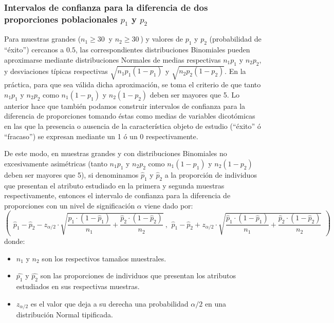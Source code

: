 \subsubsection {Intervalos de confianza para la diferencia de dos proporciones poblacionales $p_1$ y $p_2$}
Para muestras grandes ($n_1\geq30~$ y $n_2\geq30~$) y valores de $p_1$ y $p_2$ (probabilidad de ``éxito'') cercanos a
$0.5$, las correspondientes distribuciones Binomiales pueden aproximarse mediante distribuciones Normales de medias
respectivas $n_1p_1$ y $n_2p_2$, y desviaciones típicas respectivas $\sqrt {n_1p_1(1-p_1)}$ y $\sqrt {n_2p_2(1-p_2)}$. En
la práctica, para que sea válida dicha aproximación, se toma el criterio de que tanto $n_1p_1$ y $n_2p_2$ como
$n_1(1-p_1)$ y $n_2(1-p_2)$ deben ser mayores que 5. Lo anterior hace que también podamos construir intervalos de
confianza para la diferencia de proporciones tomando éstas como medias de variables dicotómicas en las que la presencia o
ausencia de la característica objeto de estudio (``éxito'' ó ``fracaso'') se expresan mediante un 1 ó un 0
respectivamente.

De este modo, en muestras grandes y con distribuciones Binomiales no excesivamente asimétricas (tanto $n_1p_1$ y $n_2p_2$
como $n_1(1-p_1)$ y $n_2(1-p_2)$ deben ser mayores que 5), si denominamos $\widehat{p}_1$ y $\widehat{p}_2$ a la
proporción de individuos que presentan el atributo estudiado en la primera y segunda muestras respectivamente, entonces
el intervalo de confianza para la diferencia de proporciones con un nivel de significación $\alpha$ viene dado por:
\[
\left(
\begin{array}{c}
\widehat{p}_{1}-\widehat{p}_{2}-z_{\alpha /2}\cdot \sqrt{\dfrac{\widehat{p}
_{1}\cdot (1-\widehat{p}_{1})}{n_{1}}+\dfrac{\widehat{p}_{2}\cdot (1-
\widehat{p}_{2})}{n_{2}}}\ , \,
\ \widehat{p}_{1}-\widehat{p}_{2}+z_{\alpha /2}\cdot \sqrt{\dfrac{\widehat{p}
_{1}\cdot (1-\widehat{p}_{1})}{n_{1}}+\dfrac{\widehat{p}_{2}\cdot (1-
\widehat{p}_{2})}{n_{2}}}
\end{array}
\right)
\]
donde:
\begin{itemize}[label=--]
\item $n_1$ y $n_2$ son los respectivos tamaños muestrales. 
\item $\widehat{p_1}$ y $\widehat{p_2}$ son las proporciones de individuos que presentan los atributos estudiados en sus
respectivas muestras.
\item $z_{\alpha /2}$ es el valor que deja a su derecha una probabilidad $\alpha /2 $ en una distribución Normal
tipificada.
\end{itemize}

